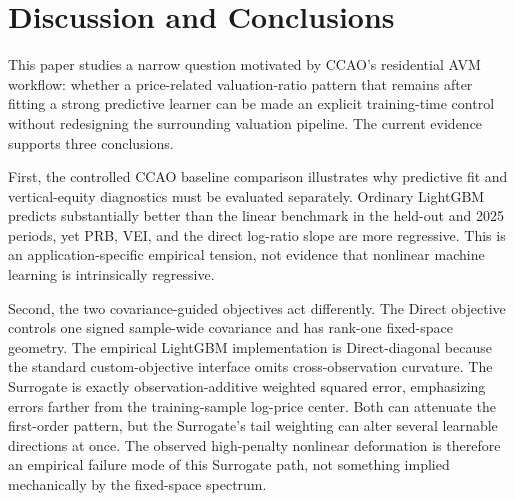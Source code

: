 \documentclass[10pt]{article}
\theoremstyle{definition}
\newcommand{\1}{\mathbf{1}}
\begin{document}

\section{Discussion and Conclusions}
\label{sec:discussion}

This paper studies a narrow question motivated by CCAO's residential AVM workflow: whether a price-related valuation-ratio pattern that remains after fitting a strong predictive learner can be made an explicit training-time control without redesigning the surrounding valuation pipeline. The current evidence supports three conclusions.

First, the controlled CCAO baseline comparison illustrates why predictive fit and vertical-equity diagnostics must be evaluated separately. Ordinary LightGBM predicts substantially better than the linear benchmark in the held-out and 2025 periods, yet PRB, VEI, and the direct log-ratio slope are more regressive. This is an application-specific empirical tension, not evidence that nonlinear machine learning is intrinsically regressive.

Second, the two covariance-guided objectives act differently. The Direct objective controls one signed sample-wide covariance and has rank-one fixed-space geometry. The empirical LightGBM implementation is Direct-diagonal because the standard custom-objective interface omits cross-observation curvature. The Surrogate is exactly observation-additive weighted squared error, emphasizing errors farther from the training-sample log-price center. Both can attenuate the first-order pattern, but the Surrogate's tail weighting can alter several learnable directions at once. The observed high-penalty nonlinear deformation is therefore an empirical failure mode of this Surrogate path, not something implied mechanically by the fixed-space spectrum.
\end{document}
